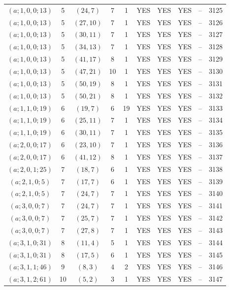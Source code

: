 \begin{longtable}{|c|c|c|c|c|c|c|c|c|c|}
$(a; 1, 0, 0; 13)$ & 5 & $(24, 7)$ & 7 & 1 & YES & YES & YES & -- & 3125\\
$(a; 1, 0, 0; 13)$ & 5 & $(27, 10)$ & 7 & 1 & YES & YES & YES & -- & 3126\\
$(a; 1, 0, 0; 13)$ & 5 & $(30, 11)$ & 7 & 1 & YES & YES & YES & -- & 3127\\
$(a; 1, 0, 0; 13)$ & 5 & $(34, 13)$ & 7 & 1 & YES & YES & YES & -- & 3128\\
$(a; 1, 0, 0; 13)$ & 5 & $(41, 17)$ & 8 & 1 & YES & YES & YES & -- & 3129\\
$(a; 1, 0, 0; 13)$ & 5 & $(47, 21)$ & 10 & 1 & YES & YES & YES & -- & 3130\\
$(a; 1, 0, 0; 13)$ & 5 & $(50, 19)$ & 8 & 1 & YES & YES & YES & -- & 3131\\
$(a; 1, 0, 0; 13)$ & 5 & $(50, 21)$ & 8 & 1 & YES & YES & YES & -- & 3132\\
$(a; 1, 1, 0; 19)$ & 6 & $(19, 7)$ & 6 & 19 & YES & YES & YES & -- & 3133\\
$(a; 1, 1, 0; 19)$ & 6 & $(25, 11)$ & 7 & 1 & YES & YES & YES & -- & 3134\\
$(a; 1, 1, 0; 19)$ & 6 & $(30, 11)$ & 7 & 1 & YES & YES & YES & -- & 3135\\
$(a; 2, 0, 0; 17)$ & 6 & $(23, 10)$ & 7 & 1 & YES & YES & YES & -- & 3136\\
$(a; 2, 0, 0; 17)$ & 6 & $(41, 12)$ & 8 & 1 & YES & YES & YES & -- & 3137\\
$(a; 2, 0, 1; 25)$ & 7 & $(18, 7)$ & 6 & 1 & YES & YES & YES & -- & 3138\\
$(a; 2, 1, 0; 5)$ & 7 & $(17, 7)$ & 6 & 1 & YES & YES & YES & -- & 3139\\
$(a; 2, 1, 0; 5)$ & 7 & $(24, 7)$ & 7 & 1 & YES & YES & YES & -- & 3140\\
$(a; 3, 0, 0; 7)$ & 7 & $(24, 7)$ & 7 & 1 & YES & YES & YES & -- & 3141\\
$(a; 3, 0, 0; 7)$ & 7 & $(25, 7)$ & 7 & 1 & YES & YES & YES & -- & 3142\\
$(a; 3, 0, 0; 7)$ & 7 & $(27, 8)$ & 7 & 1 & YES & YES & YES & -- & 3143\\
$(a; 3, 1, 0; 31)$ & 8 & $(11, 4)$ & 5 & 1 & YES & YES & YES & -- & 3144\\
$(a; 3, 1, 0; 31)$ & 8 & $(17, 5)$ & 6 & 1 & YES & YES & YES & -- & 3145\\
$(a; 3, 1, 1; 46)$ & 9 & $(8, 3)$ & 4 & 2 & YES & YES & YES & -- & 3146\\
$(a; 3, 1, 2; 61)$ & 10 & $(5, 2)$ & 3 & 1 & YES & YES & YES & -- & 3147\\

\end{longtable}
